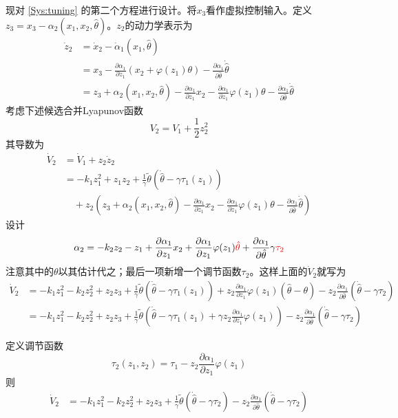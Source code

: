 现对 \eqref{Sys:tuning} 的第二个方程进行设计。将$x_3$看作虚拟控制输入。定义$z_3 = x_3 - \alpha_2 (x_1,x_2, \hat{\theta})$。$z_2$的动力学表示为
\begin{align*}
  \dot{z}_2 & = \dot{x}_2 - \dot{\alpha}_1 (x_1, \hat{\theta})\\
  & = x_3 - \frac{\partial \alpha_1}{\partial z_1} (x_2+\varphi(z_1)\theta)- \frac{\partial
  \alpha_1}{\partial \hat{\theta} } \dot{\hat{\theta}} \\
  & = z_3+\alpha_2(x_1,x_2, \hat{\theta}) - \frac{\partial \alpha_1}{\partial z_1} x_2 - \frac{\partial \alpha_1}{\partial z_1}\varphi(z_1)
  \theta - \frac{\partial
  \alpha_1}{\partial \hat{\theta} } \dot{\hat{\theta}}
\end{align*}
考虑下述候选合并Lyapunov函数
\[ V_2 = V_1 + \frac{1}{2} z^2_2 \]
其导数为
\begin{align*}
    \dot{V}_2&=\dot{V}_1+z_2\dot{z}_2\\
    &=-k_1z_1^2+z_1z_2+\frac{1}{\gamma}\tilde{\theta}(\dot{\hat{\theta}}-\gamma \tau_1(z_1))\\
    &\quad +z_2\left(z_3+\alpha_2(x_1,x_2, \hat{\theta}) - \frac{\partial \alpha_1}{\partial z_1} x_2 - \frac{\partial \alpha_1}{\partial z_1}\varphi(z_1) \theta - \frac{\partial
  \alpha_1}{\partial \hat{\theta} } \dot{\hat{\theta}}\right)
\end{align*}
设计\[\alpha_2=-k_2z_2-z_1+\frac{\partial \alpha_1}{\partial z_1} x_2 +\frac{\partial \alpha_1}{\partial z_1}\varphi(z_1) \textcolor{red}{\hat\theta}+\frac{\partial
  \alpha_1}{\partial \hat{\theta} } \gamma \textcolor{red}{\tau_2}\]
注意其中的$\theta$以其估计代之；最后一项新增一个调节函数$\tau_2$。这样上面的$\dot{V}_2$就写为
\begin{align*}
    \dot{V}_2&=-k_1z_1^2-k_2z_2^2+z_2z_3+\frac{1}{\gamma}\tilde{\theta}(\dot{\hat{\theta}}-\gamma \tau_1(z_1))+z_2\frac{\partial \alpha_1}{\partial z_1}\varphi(z_1) (\hat\theta-\theta)-z_2\frac{\partial
  \alpha_1}{\partial \hat{\theta} }(\dot{\hat{\theta}}-\gamma\tau_2)\\
  &=-k_1z_1^2-k_2z_2^2+z_2z_3+\frac{1}{\gamma}\tilde{\theta}\left(\dot{\hat{\theta}}-\gamma \tau_1(z_1)+\gamma z_2\frac{\partial \alpha_1}{\partial z_1}\varphi(z_1)\right)-z_2\frac{\partial
  \alpha_1}{\partial \hat{\theta} }(\dot{\hat{\theta}}-\gamma\tau_2)
\end{align*}

定义调节函数\[\tau_2(z_1,z_2)=\tau_1-z_2\frac{\partial \alpha_1}{\partial z_1}\varphi(z_1)\]
则
\begin{align*}
    \dot{V}_2&=-k_1z_1^2-k_2z_2^2+z_2z_3+\frac{1}{\gamma}\tilde{\theta}(\dot{\hat{\theta}}-\gamma \tau_2)-z_2\frac{\partial
  \alpha_1}{\partial \hat{\theta} }(\dot{\hat{\theta}}-\gamma\tau_2)
\end{align*}


